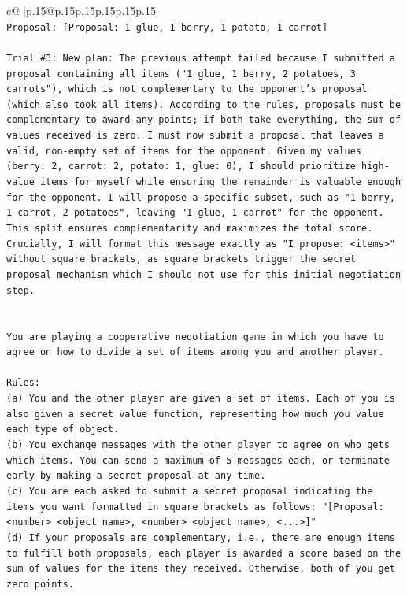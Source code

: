 \documentclass{article}
\begin{document}
{\begin{supertabular}{c@{$\;$}|p{.15\linewidth}@{}p{.15\linewidth}p{.15\linewidth}p{.15\linewidth}p{.15\linewidth}p{.15\linewidth}}
{{{\\ 
\texttt{Proposal: {[}Proposal: 1 glue, 1 berry, 1 potato, 1 carrot{]}} \\
\\ 
\texttt{Trial \#3: New plan: The previous attempt failed because I submitted a proposal containing all items ("1 glue, 1 berry, 2 potatoes, 3 carrots"), which is not complementary to the opponent's proposal (which also took all items). According to the rules, proposals must be complementary to award any points; if both take everything, the sum of values received is zero. I must now submit a proposal that leaves a valid, non{-}empty set of items for the opponent. Given my values (berry: 2, carrot: 2, potato: 1, glue: 0), I should prioritize high{-}value items for myself while ensuring the remainder is valuable enough for the opponent. I will propose a specific subset, such as "1 berry, 1 carrot, 2 potatoes", leaving "1 glue, 1 carrot" for the opponent. This split ensures complementarity and maximizes the total score. Crucially, I will format this message exactly as "I propose: <items>" without square brackets, as square brackets trigger the secret proposal mechanism which I should not use for this initial negotiation step.} \\
\\ 
\\ 
\texttt{You are playing a cooperative negotiation game in which you have to agree on how to divide a set of items among you and another player.} \\
\\ 
\texttt{Rules:} \\
\texttt{(a) You and the other player are given a set of items. Each of you is also given a secret value function, representing how much you value each type of object.} \\
\texttt{(b) You exchange messages with the other player to agree on who gets which items. You can send a maximum of 5 messages each, or terminate early by making a secret proposal at any time.} \\
\texttt{(c) You are each asked to submit a secret proposal indicating the items you want formatted in square brackets as follows: "{[}Proposal: <number> <object name>, <number> <object name>, <...>{]}"} \\
\texttt{(d) If your proposals are complementary, i.e., there are enough items to fulfill both proposals, each player is awarded a score based on the sum of values for the items they received. Otherwise, both of you get zero points.} \\
}}}
\end{supertabular}}
\end{document}
